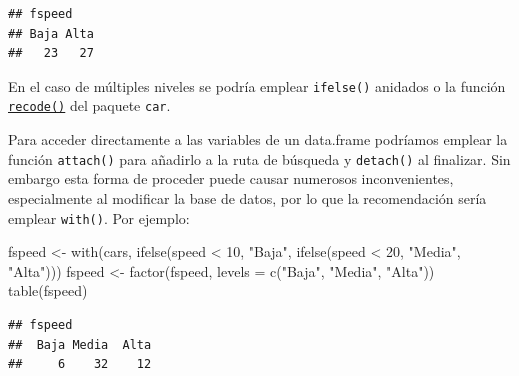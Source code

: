 \documentclass[
]{book}
\newenvironment{Shaded}{\begin{snugshade}}{\end{snugshade}}
\newcommand{\AttributeTok}[1]{\textcolor[rgb]{0.77,0.63,0.00}{#1}}
\newcommand{\CommentTok}[1]{\textcolor[rgb]{0.56,0.35,0.01}{\textit{#1}}}
\newcommand{\DecValTok}[1]{\textcolor[rgb]{0.00,0.00,0.81}{#1}}
\newcommand{\FunctionTok}[1]{\textcolor[rgb]{0.00,0.00,0.00}{#1}}
\newcommand{\NormalTok}[1]{#1}
\newcommand{\OtherTok}[1]{\textcolor[rgb]{0.56,0.35,0.01}{#1}}
\newcommand{\SpecialCharTok}[1]{\textcolor[rgb]{0.00,0.00,0.00}{#1}}
\newcommand{\StringTok}[1]{\textcolor[rgb]{0.31,0.60,0.02}{#1}}
\theoremstyle{break}
\theoremstyle{nonumberplain}
\begin{document}
\begin{Shaded}
\end{Shaded}

\begin{verbatim}
## fspeed
## Baja Alta 
##   23   27
\end{verbatim}

En el caso de múltiples niveles se podría emplear \texttt{ifelse()} anidados o la función \href{https://www.rdocumentation.org/packages/car/versions/3.0-9/topics/recode}{\texttt{recode()}} del paquete \texttt{car}.

Para acceder directamente a las variables de un data.frame podríamos emplear la función \texttt{attach()} para añadirlo a la ruta de búsqueda y \texttt{detach()} al finalizar.
Sin embargo esta forma de proceder puede causar numerosos inconvenientes, especialmente al modificar la base de datos, por lo que la recomendación sería emplear \texttt{with()}.
Por ejemplo:

\begin{Shaded}
\begin{Highlighting}[]
\NormalTok{fspeed }\OtherTok{\textless{}{-}} \FunctionTok{with}\NormalTok{(cars, }\FunctionTok{ifelse}\NormalTok{(speed }\SpecialCharTok{\textless{}} \DecValTok{10}\NormalTok{, }\StringTok{"Baja"}\NormalTok{,}
                 \FunctionTok{ifelse}\NormalTok{(speed }\SpecialCharTok{\textless{}} \DecValTok{20}\NormalTok{, }\StringTok{"Media"}\NormalTok{, }\StringTok{"Alta"}\NormalTok{)))}
\NormalTok{fspeed }\OtherTok{\textless{}{-}} \FunctionTok{factor}\NormalTok{(fspeed, }\AttributeTok{levels =} \FunctionTok{c}\NormalTok{(}\StringTok{"Baja"}\NormalTok{, }\StringTok{"Media"}\NormalTok{, }\StringTok{"Alta"}\NormalTok{))}
\FunctionTok{table}\NormalTok{(fspeed)}
\end{Highlighting}
\end{Shaded}

\begin{verbatim}
## fspeed
##  Baja Media  Alta 
##     6    32    12
\end{verbatim}
\end{document}
